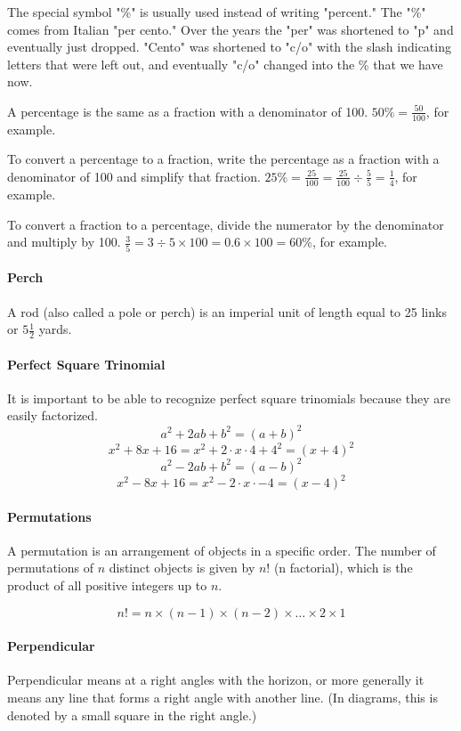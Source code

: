 \documentclass[12pt]{article}
\begin{document}
{The special symbol "\%" is usually used instead of writing "percent." The "\%" comes from Italian "per cento." Over the years the "per" was shortened to "p" and eventually just dropped. "Cento" was shortened to "c/o" with the slash indicating letters that were left out, and eventually "c/o" changed into the \% that we have now.

A percentage is the same as a fraction with a denominator of 100. $50\% = \frac{50}{100}$, for example.

To convert a percentage to a fraction, write the percentage as a fraction with a denominator of 100 and simplify that fraction. $25\%=\frac{25}{100}=\frac{25}{100}\div\frac{5}{5}=\frac{1}{4}$, for example.

To convert a fraction to a percentage, divide the numerator by the denominator and multiply by 100. $\frac{3}{5}=3\div5\times100=0.6\times100=60\%$, for example.

\paragraph{Perch}
A rod (also called a pole or perch) is an imperial unit of length equal to 25 links or $5\frac{1}{2}$ yards.

\paragraph{Perfect Square Trinomial}
It is important to be able to recognize perfect square trinomials because they are easily factorized.
\[a^2 + 2ab + b^2 = (a + b)^2\]
\[x^2 + 8x + 16 = x^2 + 2 \cdot x \cdot 4 + 4^2 = (x + 4)^2\]
\[a^2 - 2ab + b^2 = (a - b)^2\]
\[x^2 - 8x + 16 = x^2 - 2 \cdot x \cdot -4 = (x - 4)^2\]

\paragraph{Permutations}
A permutation is an arrangement of objects in a specific order. The number of permutations of \( n \) distinct objects is given by \( n! \) (n factorial), which is the product of all positive integers up to \( n \).

\[
n! = n \times (n-1) \times (n-2) \times \ldots \times 2 \times 1
\]

\paragraph{Perpendicular}
Perpendicular means at a right angles with the horizon, or more generally it means any line that forms a right angle with another line. (In diagrams, this is denoted by a small square in the right angle.)

}
\end{document}
